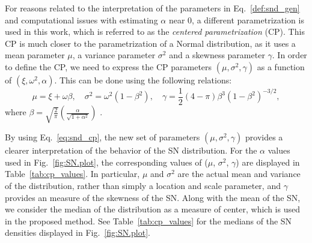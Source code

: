 \documentclass{aa}
\begin{document}
%
For reasons related to the interpretation of the parameters in Eq.~\ref{def:snd_gen} and computational issues with estimating $\alpha$ near 0, a different parametrization is used in this work, which is referred to as the \emph{centered parametrization} (CP).  This CP is much closer to the parametrization of a Normal distribution, as it uses a mean parameter $\mu$, a variance parameter $\sigma^2$ and a skewness parameter $\gamma$. In order to define the CP, we need to express the CP parameters $(\mu, \sigma^2, \gamma)$ as a function of $(\xi, \omega^2, \alpha)$. This can be done using the following relations:
%
\begin{equation} \label{eq:snd_cp}
\mu = \xi + \omega \beta, \quad \sigma^{2} = \omega^{2}(1-\beta^2), \quad \gamma = \frac{1}{2}(4-\pi) \beta^{3}\left(1-\beta^2\right)^{-3/2},
\end{equation}
%
where $\beta = \sqrt{\frac{2}{\pi}}\left(\frac{\alpha}{\sqrt{1+\alpha^2}}\right)$ \citep[e.g.][]{Arellano-2010}.

By using Eq.~\ref{eq:snd_cp}, the new set of parameters $(\mu, \sigma^2, \gamma)$ provides a clearer interpretation of the behavior of the SN distribution. For the $\alpha$ values used in Fig.~\ref{fig:SN.plot}, the corresponding values of ($\mu$, $\sigma^2$, $\gamma$) are displayed in Table~\ref{tab:cp_values}.  In particular, $\mu$ and $\sigma^2$ are the actual mean and variance of the distribution, rather than simply a location and scale parameter, and $\gamma$ provides an measure of the skewness of the SN. 
Along with the mean of the SN, we consider the median of the distribution as a measure of center, which is used in the proposed method.  See Table~\ref{tab:cp_values} for the medians of the SN densities displayed in Fig.~\ref{fig:SN.plot}.
%
\end{document}
